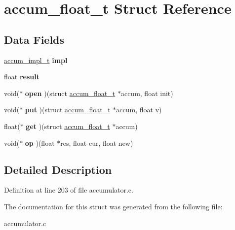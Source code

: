 \hypertarget{structaccum__float__t}{\section{accum\-\_\-float\-\_\-t Struct Reference}
\label{structaccum__float__t}
}
\subsection*{Data Fields}
\begin{DoxyCompactItemize}
\item 
\hypertarget{structaccum__float__t_aad69ed38cc1d52404ebf5887f9e5a723}{\hyperlink{structaccum__impl__t}{accum\-\_\-impl\-\_\-t} {\bfseries impl}}\label{structaccum__float__t_aad69ed38cc1d52404ebf5887f9e5a723}

\item 
\hypertarget{structaccum__float__t_a77130d1855af534130197e8fa1b4b631}{float {\bfseries result}}\label{structaccum__float__t_a77130d1855af534130197e8fa1b4b631}

\item 
\hypertarget{structaccum__float__t_ab8072736f20f04ce45b33d6ab42a0f06}{void($\ast$ {\bfseries open} )(struct \hyperlink{structaccum__float__t}{accum\-\_\-float\-\_\-t} $\ast$accum, float init)}\label{structaccum__float__t_ab8072736f20f04ce45b33d6ab42a0f06}

\item 
\hypertarget{structaccum__float__t_ad3052bb3b5febc50dad3db2e4874a2be}{void($\ast$ {\bfseries put} )(struct \hyperlink{structaccum__float__t}{accum\-\_\-float\-\_\-t} $\ast$accum, float v)}\label{structaccum__float__t_ad3052bb3b5febc50dad3db2e4874a2be}

\item 
\hypertarget{structaccum__float__t_a6e4e37362cd6fb85373dc2a05fb0ae7f}{float($\ast$ {\bfseries get} )(struct \hyperlink{structaccum__float__t}{accum\-\_\-float\-\_\-t} $\ast$accum)}\label{structaccum__float__t_a6e4e37362cd6fb85373dc2a05fb0ae7f}

\item 
\hypertarget{structaccum__float__t_a77edf6e3a1a1257c7d3a6df4985a7385}{void($\ast$ {\bfseries op} )(float $\ast$res, float cur, float new)}\label{structaccum__float__t_a77edf6e3a1a1257c7d3a6df4985a7385}

\end{DoxyCompactItemize}


\subsection{Detailed Description}


Definition at line 203 of file accumulator.\-c.



The documentation for this struct was generated from the following file\-:\begin{DoxyCompactItemize}
\item 
accumulator.\-c\end{DoxyCompactItemize}
